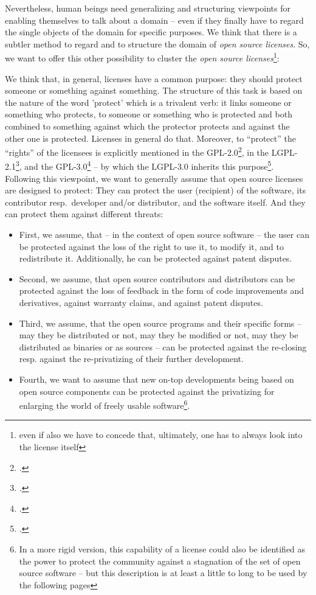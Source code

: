 Nevertheless, human beings need generalizing and structuring viewpoints for
enabling themselves to talk about a domain -- even if they finally have to
regard the single objects of the domain for specific purposes. We think that
there is a subtler method to regard and to structure the domain of \emph{open
source licenses}. So, we want to offer this other possibility to cluster the
\emph{open source licenses}\footnote{even if also we have to concede that,
ultimately, one has to always look into the license itself}:

We think that, in general, licenses have a common purpose: they should protect
someone or something against something. The structure of this task is based on
the nature of the word 'protect' which is a trivalent verb: it links someone or
something who protects, to someone or something who is protected and both
combined to something against which the protector protects and against the other
one is protected. Licenses in general do that. Moreover, to \enquote{protect}
the \enquote{rights} of the licensees is explicitly mentioned in the
GPL-2.0\footcite[cf.][\nopage wp. Preamble]{Gpl20OsiLicense1991a}, in the
LGPL-2.1\footcite[cf.][\nopage wp. Preamble]{Lgpl21OsiLicense1999a}, and the
GPL-3.0\footcite[cf.][\nopage wp. Preamble]{Gpl30OsiLicense2007a} -- by which the
LGPL-3.0 inherits this purpose\footcite[cf.][\nopage wp.
prefix]{Lgpl30OsiLicense2007a}. Following this viewpoint, we want to generally
assume that open source licenses are designed to protect: They can protect
the user (recipient) of the software, its contributor resp.\ developer and/or
distributor, and the software itself. And they can protect them against
different threats:

\begin{itemize}
  \item First, we assume, that -- in the context of open source software -- the
  user can be protected against the loss of the right to use it, to modify it,
  and to redistribute it. Additionally, he can be protected against patent
  disputes.
  \item Second, we assume, that open source contributors and distributors can be
  protected against the loss of feedback in the form of code improvements and
  derivatives, against warranty claims, and against patent disputes.
  \item Third, we assume, that the open source programs and their specific forms
  -- may they be distributed or not, may they be modified or not, may they be
  distributed as binaries or as sources -- can be protected against the
  re-closing resp. against the re-privatizing of their further development.
  \item Fourth, we want to assume that new on-top developments being based on
  open source components can be protected against the privatizing for enlarging
  the world of freely usable software\footnote{In a more rigid version, this
  capability of a license could also be identified as the power to protect the
  community against a stagnation of the set of open source software -- but this
  description is at least a little to long to be used by the following pages}.
\end{itemize}

